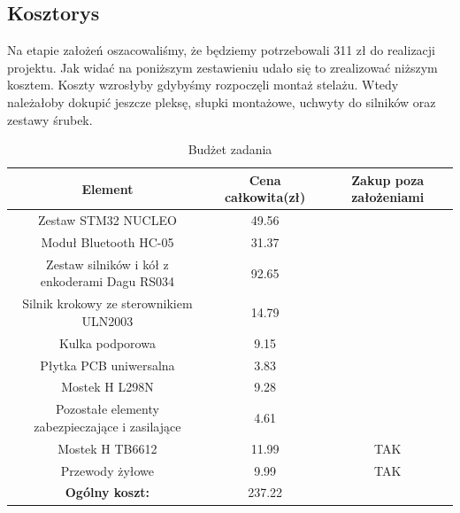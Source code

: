\documentclass[a4paper]{article}
\begin{document}
\subsection{Kosztorys}
Na etapie założeń oszacowaliśmy, że będziemy potrzebowali 311 zł do realizacji projektu. Jak widać na poniższym zestawieniu udało się to zrealizować niższym kosztem. Koszty wzrosłyby gdybyśmy rozpoczęli montaż stelażu. Wtedy należałoby dokupić jeszcze pleksę, słupki montażowe, uchwyty do silników oraz zestawy śrubek. 
\begin{table}[H]
\begin{center}
\begin{tabular}{|c|c|c|}
\hline
\textbf{Element} & \textbf{Cena całkowita(zł)} & \textbf{Zakup poza założeniami}\\ \hline\hline
Zestaw STM32 NUCLEO & 49.56 & \\ \hline
Moduł Bluetooth HC-05 & 31.37 & \\ \hline
Zestaw silników i kół z enkoderami Dagu RS034 & 92.65 & \\ \hline
Silnik krokowy ze sterownikiem ULN2003 & 14.79 & \\ \hline
Kulka podporowa & 9.15 & \\ \hline
Płytka PCB uniwersalna & 3.83 & \\ \hline
Mostek H L298N & 9.28 & \\ \hline
Pozostałe elementy zabezpieczające i zasilające & 4.61 & \\ \hline
Mostek H TB6612 & 11.99 & TAK\\ \hline
Przewody żyłowe & 9.99 & TAK\\ \hline\hline
\textbf{Ogólny koszt:} & 237.22 & \\ \hline
\end{tabular}
\caption{Budżet zadania}
\end{center}
\end{table}
\end{document}
